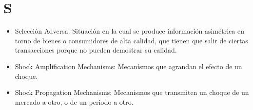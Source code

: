 \documentclass{article}
\begin{document}
\section{S}
\begin{itemize}

\item Selección Adversa: Situación en la cual se produce información asimétrica en torno de bienes o consumidores de alta calidad, que tienen que salir de ciertas transacciones porque no pueden demostrar su calidad.

\item Shock Amplification Mechanisms: Mecanísmos que agrandan el efecto de un choque.

\item Shock Propagation Mechanisms: Mecanismos que transmiten un choque de un mercado a otro, o de un periodo a otro.

\end{itemize}
\end{document}
